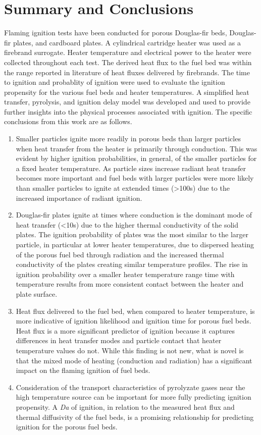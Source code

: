 \section{Summary and Conclusions}
    Flaming ignition tests have been conducted for porous Douglas-fir beds, Douglas-fir plates, and cardboard plates. A cylindrical cartridge heater was used as a firebrand surrogate. Heater temperature and electrical power to the heater were collected throughout each test. The derived heat flux to the fuel bed was within the range reported in literature of heat fluxes delivered by firebrands.  The time to ignition and probablity of ignition were used to evaluate the ignition propensity for the various fuel beds and heater temperatures.  A simplified heat transfer, pyrolysis, and ignition delay model was developed and used to provide further insights into the physical processes associated with ignition. The specific conclusions from this work are as follows.
        \begin{enumerate}
            \item 
                Smaller particles ignite more readily in porous beds than larger particles when heat transfer from the heater is primarily through conduction. This was evident by higher ignition probabilities, in general, of the smaller particles for a fixed heater temperature. As particle sizes increase radiant heat transfer becomes more important and fuel beds with larger particles were more likely than smaller particles to ignite at extended times (\textgreater 100\si{\second}) due to the increased importance of radiant ignition. 
            \item
                Douglas-fir plates ignite at times where conduction is the dominant mode of heat transfer (\textless 10\si{\second}) due to the higher thermal conductivity of the solid plates. The ignition probability of plates was the most similar to the larger particle, in particular at lower heater temperatures, due to dispersed heating of the porous fuel bed through radiation and the increased thermal conductivity of the plates creating similar temperature profiles. The rise in ignition probability  over a smaller heater temperature range time with temperature results from more consistent contact between the heater and plate surface.
            \item 
                Heat flux delivered to the fuel bed, when compared to heater temperature, is more indicative of ignition likelihood and ignition time for porous fuel beds. Heat flux is a more significant predictor of ignition because it captures differences in heat transfer modes and particle contact that heater temperature values do not. While this finding is not new, what is novel is that the mixed mode of heating (conduction and radiation) has a significant impact on the flaming ignition of fuel beds.
            \item 
                Consideration of the transport characteristics of pyrolyzate gases near the high temperature source can be important for more fully predicting ignition propensity. A \textit{Da} of ignition, in relation to the measured heat flux and thermal diffusivity of the fuel beds, is a promising relationship for predicting ignition for the porous fuel beds.  
        \end{enumerate}
